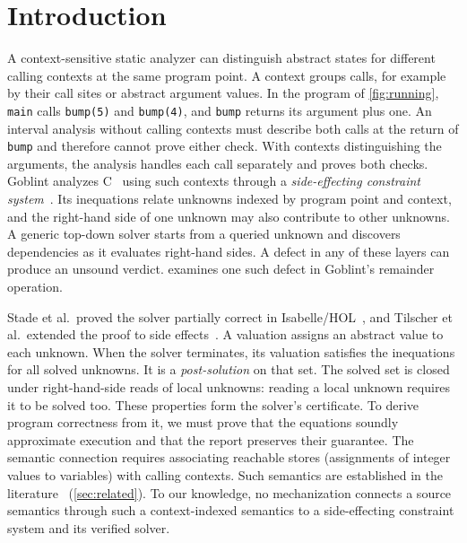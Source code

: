 \section{Introduction}
\label{sec:intro}

A context-sensitive static analyzer can distinguish abstract states for
different calling contexts at the same program point. A context groups calls,
for example by their call sites or abstract argument values. In the program of \cref{fig:running},
\texttt{main} calls \texttt{bump(5)} and \texttt{bump(4)}, and \texttt{bump}
returns its argument plus one. An interval analysis without calling contexts must describe both calls at
the return of \texttt{bump} and therefore cannot prove either check. With contexts distinguishing the arguments, the analysis handles each call
separately and proves both checks. Goblint analyzes C~\cite{vojdani16,seidl26} using such contexts through a
\emph{side-effecting constraint system}~\cite{seidl03,apinis12}. Its inequations relate unknowns
indexed by program point and context, and the right-hand side of one unknown
may also contribute to other unknowns. A generic top-down solver starts from
a queried unknown and discovers dependencies as it evaluates right-hand sides.
A defect in any of these layers can produce an unsound verdict.
 examines one such defect in Goblint's remainder operation.

Stade et al.\ proved the solver partially correct in
Isabelle/HOL~\cite{stade24}, and Tilscher et al.\ extended the proof to side
effects~\cite{tilscher26}. A valuation assigns an abstract value to each unknown.
When the solver terminates, its valuation satisfies
the inequations for all solved unknowns. It is a \emph{post-solution} on that set. The solved set is closed under right-hand-side reads of local unknowns:
reading a local unknown requires it to be solved too. These properties form
the solver's certificate. To derive program correctness from it, we must prove that the
equations soundly approximate execution and that the report preserves their
guarantee. The semantic connection requires associating reachable stores
(assignments of integer values to variables) with calling contexts. Such semantics are established in the
literature~\cite{sharir81,knoop92,jeannet04,vanhorn10} (\cref{sec:related}). To
our knowledge, no mechanization connects a source semantics through such a context-indexed
semantics to a side-effecting constraint system and its verified solver.

